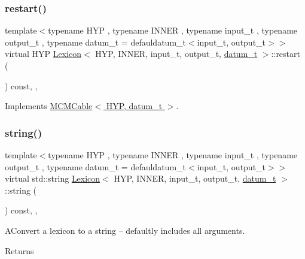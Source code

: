 \subsubsection{\texorpdfstring{restart()}{restart()}}
{\footnotesize\ttfamily template$<$typename H\+YP , typename I\+N\+N\+ER , typename input\+\_\+t , typename output\+\_\+t , typename datum\+\_\+t  = defauldatum\+\_\+t$<$input\+\_\+t, output\+\_\+t$>$$>$ \\
virtual H\+YP \hyperlink{class_lexicon}{Lexicon}$<$ H\+YP, I\+N\+N\+ER, input\+\_\+t, output\+\_\+t, \hyperlink{class_bayesable_a9f1a6c0cd7855550fa10b1a8f13a5867}{datum\+\_\+t} $>$\+::restart (\begin{DoxyParamCaption}{ }\end{DoxyParamCaption}) const\hspace{0.3cm}{\ttfamily [inline]}, {\ttfamily [override]}, {\ttfamily [virtual]}}



Implements \hyperlink{class_m_c_m_cable_a220d6c4ca73e20441c14fa5bd3e090d3}{M\+C\+M\+Cable$<$ H\+Y\+P, datum\+\_\+t $>$}.

\mbox{\label{class_lexicon_a5c584d2885a21542082332a26eb0961b}} 
\subsubsection{\texorpdfstring{string()}{string()}}
{\footnotesize\ttfamily template$<$typename H\+YP , typename I\+N\+N\+ER , typename input\+\_\+t , typename output\+\_\+t , typename datum\+\_\+t  = defauldatum\+\_\+t$<$input\+\_\+t, output\+\_\+t$>$$>$ \\
virtual std\+::string \hyperlink{class_lexicon}{Lexicon}$<$ H\+YP, I\+N\+N\+ER, input\+\_\+t, output\+\_\+t, \hyperlink{class_bayesable_a9f1a6c0cd7855550fa10b1a8f13a5867}{datum\+\_\+t} $>$\+::string (\begin{DoxyParamCaption}{ }\end{DoxyParamCaption}) const\hspace{0.3cm}{\ttfamily [inline]}, {\ttfamily [override]}, {\ttfamily [virtual]}}

A\+Convert a lexicon to a string -- defaultly includes all arguments. \begin{DoxyReturn}{Returns}

\end{DoxyReturn}


